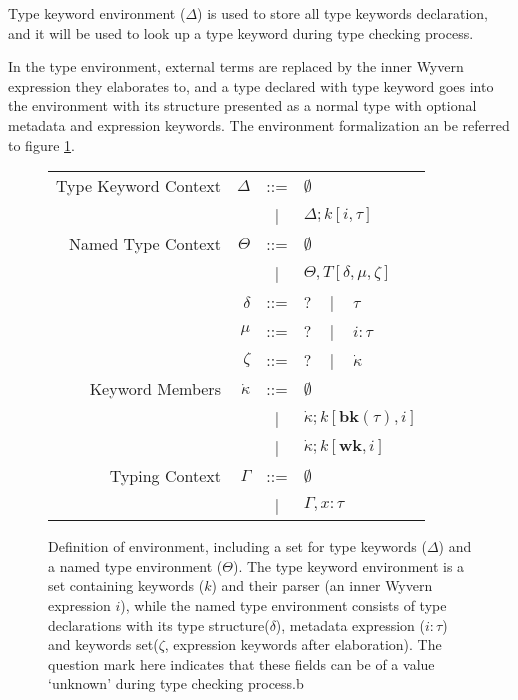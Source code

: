 \documentclass{sig-alternate}
\begin{document}
Type keyword environment ($\Delta$) is used to store all type keywords declaration, and it will be used to look up a type keyword during type checking process.

In the type environment, external terms are replaced by the inner Wyvern expression they elaborates to, and a type declared with type keyword goes into the environment with its structure presented as a normal type with optional metadata and expression keywords. The environment formalization an be referred to figure \ref{typechecking-environment}.

\begin{figure}[ht]
\begin{center}
\begin{tabular}{r r c l}
Type Keyword Context & $\Delta$ & ::= & $\emptyset$\\
              &                 &  |  & $\Delta;k[i,\tau]$\\
Named Type Context  & $\Theta$        & ::= & $\emptyset$\\
              &                 &  |  & $\Theta,T[\delta,\mu,\zeta]$\\
              & $\delta$        & ::= & $?$ ~ | ~ $\tau$\\
   & $\mu$           & ::= & $?$ ~ | ~ $i:\tau$\\
   & $\zeta$         & ::= & $?$ ~ | ~ $\dot\kappa$\\
Keyword Members & $\dot\kappa$    & ::= & $\emptyset$\\
            &                 &   |  & $\dot\kappa;k[\mathbf{bk}(\tau),i]$\\
            &                 &   |  & $\dot\kappa;k[\mathbf{wk},i]$\\
Typing Context & $\Gamma$ &   ::=  & $\emptyset$\\
                 &          &     |  & $\Gamma,x:\tau$
\end{tabular}
\end{center}
\caption{Definition of environment, including a set for type keywords ($\Delta$) and a named type environment ($\Theta$). The type keyword environment is a set containing keywords ($k$) and their parser (an inner Wyvern expression $i$), while the named type environment consists of type declarations with its type structure($\delta$), metadata expression ($i:\tau$) and keywords set($\zeta$, expression keywords after elaboration). The question mark here indicates that these fields can be of a value `unknown' during type checking process.b}
\label{typechecking-environment}

\end{figure}
\end{document}
